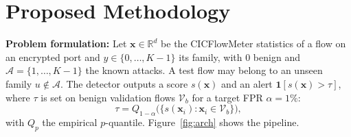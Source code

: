 \documentclass[pdflatex,sn-mathphys-num,iicol]{sn-jnl}%
\begin{document}
\section{Proposed Methodology}\label{sec:method}

\textbf{Problem formulation:} Let $\mathbf{x}\in\mathbb{R}^{d}$ be the CICFlowMeter statistics \cite{lashkari2017cicflowmeter} of a flow on an encrypted port and $y\in\{0,\dots,K-1\}$ its family, with $0$ benign and $\mathcal{A}=\{1,\dots,K-1\}$ the known attacks. A test flow may belong to an unseen family $u\notin\mathcal{A}$. The detector outputs a score $s(\mathbf{x})$ and an alert $\mathbf{1}[s(\mathbf{x})>\tau]$, where $\tau$ is set on benign validation flows $\mathcal{V}_{b}$ for a target FPR $\alpha=1\%$:
\begin{equation}
\tau = Q_{1-\alpha}\big(\{s(\mathbf{x}_i):\mathbf{x}_i\in\mathcal{V}_{b}\}\big),\label{eq:tau}
\end{equation}
with $Q_p$ the empirical $p$-quantile. Figure~\ref{fig:arch} shows the pipeline.
\end{document}
